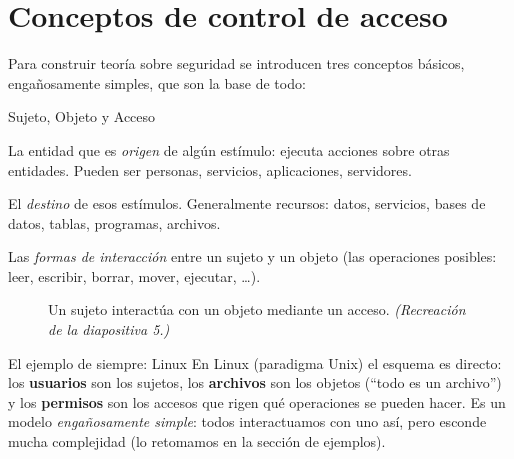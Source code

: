 \documentclass[11pt,a4paper]{article}
\begin{document}
\section{Conceptos de control de acceso}

Para construir teoría sobre seguridad se introducen tres conceptos básicos, engañosamente
simples, que son la base de todo:

\begin{defbox}{Sujeto, Objeto y Acceso}
\begin{description}[leftmargin=2.0em,style=nextline,itemsep=2pt]
  \item[Sujeto] La entidad que es \emph{origen} de algún estímulo: ejecuta acciones sobre
        otras entidades. Pueden ser personas, servicios, aplicaciones, servidores.
  \item[Objeto] El \emph{destino} de esos estímulos. Generalmente recursos: datos, servicios,
        bases de datos, tablas, programas, archivos.
  \item[Acceso] Las \emph{formas de interacción} entre un sujeto y un objeto (las operaciones
        posibles: leer, escribir, borrar, mover, ejecutar, \dots).
\end{description}
\end{defbox}

\begin{figure}[h]
\centering
{}
\caption{Un sujeto interactúa con un objeto mediante un acceso. \textit{(Recreación de la
diapositiva 5.)}}
\end{figure}

\begin{practbox}{El ejemplo de siempre: Linux}
En Linux (paradigma Unix) el esquema es directo: los \textbf{usuarios} son los sujetos, los
\textbf{archivos} son los objetos (``todo es un archivo'') y los \textbf{permisos} son los
accesos que rigen qué operaciones se pueden hacer. Es un modelo \emph{engañosamente simple}:
todos interactuamos con uno así, pero esconde mucha complejidad (lo retomamos en la
sección de ejemplos).
\end{practbox}
\end{document}

